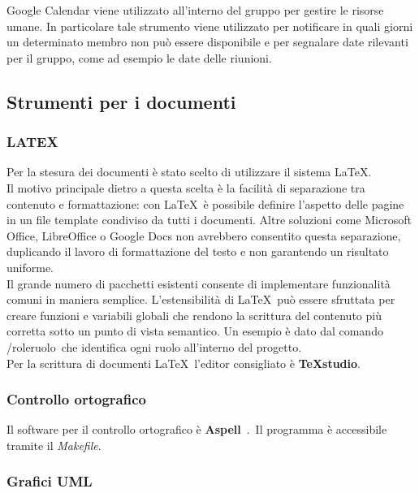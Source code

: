 Google Calendar viene utilizzato all’interno del gruppo per gestire le risorse umane. In
particolare tale strumento viene utilizzato per notificare in quali giorni un determinato
membro non pu\`{o} essere disponibile e per segnalare date rilevanti per il gruppo, come
ad esempio le date delle riunioni.



\subsection{Strumenti per i documenti}
\subsubsection{LATEX} 
 
Per la stesura dei documenti \`{e} stato scelto di utilizzare il sistema \LaTeX.\\
Il motivo 
principale dietro a questa scelta \`{e} la facilit\`{a} di separazione tra contenuto e formattazione: 
con \LaTeX\ \`{e} possibile definire l’aspetto delle pagine in un file template condiviso da tutti i documenti. Altre soluzioni come Microsoft Office, LibreOffice o Google Docs non 
avrebbero consentito questa separazione, duplicando il lavoro di formattazione del testo 
e non garantendo un risultato uniforme.\\
Il grande numero di pacchetti esistenti consente di implementare funzionalit\`{a} comuni 
in maniera semplice. L’estensibilit\`{a} di \LaTeX\ pu\`{o} essere sfruttata per creare funzioni e 
variabili globali che rendono la scrittura del contenuto pi\`{u} corretta sotto un punto di 
vista semantico. Un esempio \`{e} dato dal comando /role\textbraceleft ruolo\textbraceright\ che identifica ogni ruolo 
all’interno del progetto.\\
Per la scrittura di documenti \LaTeX\  l’editor consigliato \`{e} \textbf{TeXstudio}. 

\subsubsection{Controllo ortografico}

Il software per il controllo ortografico \`{e} \textbf{Aspell}\ .\ Il programma \`{e} accessibile tramite il \emph{Makefile}.


\subsubsection{Grafici UML} 

